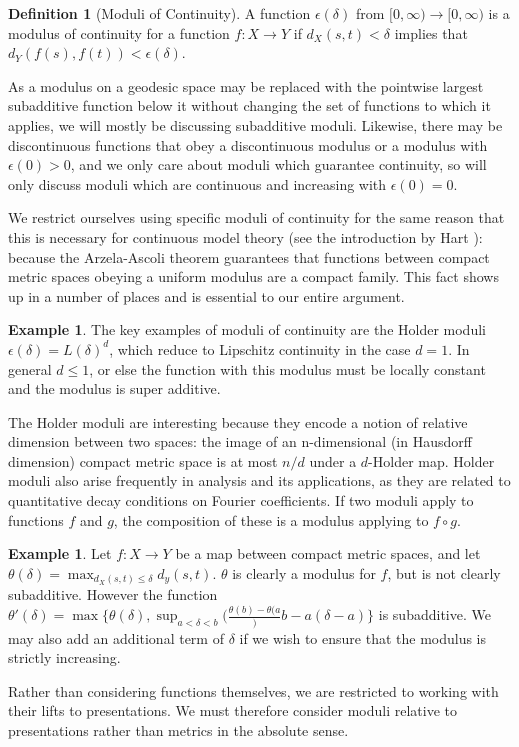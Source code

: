 \documentclass[10pt,a4paper]{article}
\theoremstyle{definition}
\newtheorem{dfn}[thm]{Definition}
\newtheorem{example}[thm]{Example}
\begin{document}
\begin{dfn}[Moduli of Continuity]
A function $\epsilon(\delta)$ from $[0,\infty)\rightarrow [0,\infty)$ is a modulus of continuity for a function $f:X\rightarrow Y$ if $d_X(s,t)<\delta$ implies that $d_Y(f(s),f(t))<\epsilon(\delta)$. 
\end{dfn}
\label{dfn:moduli}
As a modulus on a geodesic space may be replaced with the pointwise largest subadditive function below it without changing the set of functions to which it applies, we will mostly be discussing subadditive moduli. Likewise, there may be discontinuous functions that obey a discontinuous modulus or a modulus with $\epsilon(0) > 0$, and we only care about moduli which guarantee continuity, so will only discuss moduli which are continuous and increasing with $\epsilon(0) = 0$.

We restrict ourselves using specific moduli of continuity for the same reason that this is necessary for continuous model theory (see the introduction by Hart \cite{hartcontinuous}): because the Arzela-Ascoli theorem guarantees that functions between compact metric spaces obeying a uniform modulus are a compact family. This fact shows up in a number of places and is essential to our entire argument.

\begin{example}
    The key examples of moduli of continuity are the Holder moduli $\epsilon(\delta) = L (\delta)^d$, which reduce to Lipschitz continuity in the case $d = 1$. In general $d\leq 1$, or else the function with this modulus must be locally constant and the modulus is super additive. 
\end{example}
\label{example:holder}

The Holder moduli are interesting because they encode a notion of relative dimension between two spaces: the image of an n-dimensional (in Hausdorff dimension) compact metric space is at most $n/d$ under a $d$-Holder map. Holder moduli also arise frequently in analysis and its applications, as they are related to quantitative decay conditions on Fourier coefficients. If two moduli apply to functions $f$ and $g$, the composition of these is a modulus applying to $f\circ g$.

\begin{example}
    Let $f:X\rightarrow Y$ be a map between compact metric spaces, and let $\theta(\delta) = \max_{d_X(s,t)\leq\delta}d_y(s,t)$. $\theta$ is clearly a modulus for $f$, but is not clearly subadditive. However the function $\theta'(\delta) = \max\{\theta(\delta), \sup_{a<\delta < b}(\frac{\theta(b)-\theta(a}){b-a}(\delta-a)\}$ is subadditive. We may also add an additional term of $\delta$ if we wish to ensure that the modulus is strictly increasing.
\end{example}
\label{example:empirical]}
Rather than considering functions themselves, we are restricted to working with their lifts to presentations. We must therefore consider moduli relative to presentations rather than metrics in the absolute sense.
\end{document}
